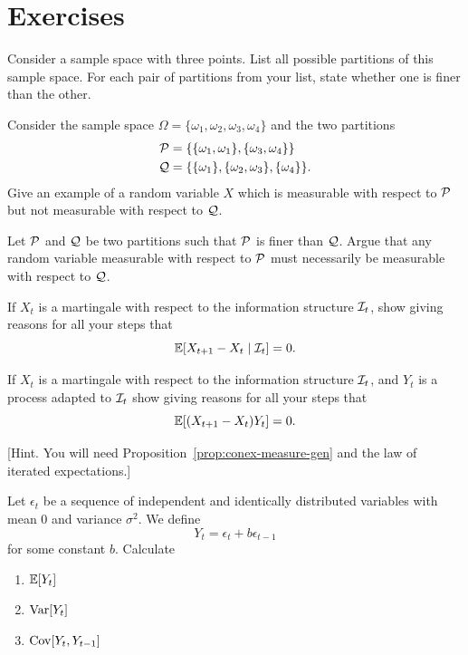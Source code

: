 \documentclass[11pt,reqno,openany]{amsbook}
\begin{document}
\section*{Exercises}
\begin{exercises}
  \item Consider a sample space with three points. List all
    possible partitions of this sample space. For each pair
    of partitions from your list, state whether one is finer
    than the other.

  \item Consider the sample space $\Omega =
    \{\omega_1,\omega_2,\omega_3,\omega_4\}$ and the two
    partitions
    \begin{align*}
      \mathcal{P} &=
      \{\{\omega_1,\omega_1\},\{\omega_3,\omega_4\}\}\\
      \mathcal{Q} &= 
      \{\{\omega_1\},\{\omega_2,\omega_3\},\{\omega_4\}\}.
    \end{align*}
    Give an example of a random variable $X$ which is
    measurable with respect to $\mathcal{P}$ but not
    measurable with respect to $\mathcal{Q}$.

    \item Let $\mathcal{P}$ and $\mathcal{Q}$ be two
      partitions such that $\mathcal{P}$ is finer than
      $\mathcal{Q}$. Argue that any random variable
      measurable with respect to $\mathcal{P}$ must
      necessarily be measurable with respect to
      $\mathcal{Q}$.

    \item If $X_t$ is a martingale with respect to the
      information structure $\mathcal{I}_t$, show giving
      reasons for all your steps that
      \[\mathbb{E}[X_{t+1}-X_t \mid \mathcal{I}_t] = 0.\]

    \item If $X_t$ is a martingale with respect to the
      information structure $\mathcal{I}_t$, and $Y_t$ is a
      process adapted to $\mathcal{I}_t$ show giving
      reasons for all your steps that
      \[\mathbb{E}[(X_{t+1}-X_t) Y_t] = 0.\]

      [Hint. You will need
      Proposition~\ref{prop:conex-measure-gen} and the law
      of iterated expectations.]

    \item Let $\epsilon_t$ be a sequence of independent and
      identically distributed variables with mean $0$ and
      variance $\sigma^2$. We define
      \[Y_t = \epsilon_{t}+b \epsilon_{t-1}\] 
      for some constant $b$. Calculate
      \begin{enumerate}
      \item $\mathbb{E}[Y_t]$
      \item $\operatorname{Var}[Y_t]$
      \item $\operatorname{Cov}[Y_t,Y_{t-1}]$
      \end{enumerate}


\end{exercises}
\end{document}
